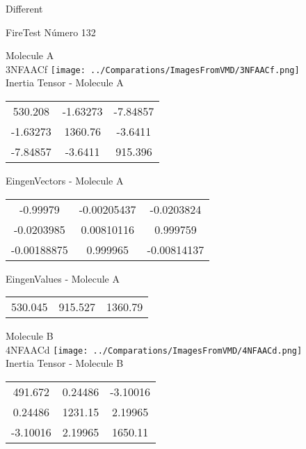 \begin{center}
\vtab
\vtab
\textcolor{NavyBlue}{\Large Different}
\end{center}

 \newpage

\vtab[-2cm]
\begin{center}
{\large FireTest \tab Número 132}
\end{center}
\begin{multicols}{2}
\begin{center}

Molecule A \\ 
3NFAACf
\texttt{[image: ../Comparations/ImagesFromVMD/3NFAACf.png]}
\\
Inertia Tensor - Molecule A \\
\vtab

\begin{tabular}{|c c c|}
530.208	 & 	-1.63273	 & 	-7.84857	 \\
-1.63273	 & 	1360.76	 & 	-3.6411	 \\
-7.84857	 & 	-3.6411	 & 	915.396
\end{tabular}

\vtab
 EingenVectors - Molecule A     \\
\vtab
\begin{tabular}{|c c c|}
-0.99979	 & 	-0.00205437	 & 	-0.0203824	 \\
-0.0203985	 & 	0.00810116	 & 	0.999759	 \\
-0.00188875	 & 	0.999965	 & 	-0.00814137
\end{tabular}

\vtab
 EingenValues - Molecule A     \\
\vtab
\begin{tabular}{|c c c|}
530.045	 & 	915.527	 & 	1360.79	 \\
\end{tabular}
\columnbreak

Molecule B \\ 
4NFAACd
\texttt{[image: ../Comparations/ImagesFromVMD/4NFAACd.png]}
\\
Inertia Tensor - Molecule B \\
\vtab

\begin{tabular}{|c c c|}
491.672	 & 	0.24486	 & 	-3.10016	 \\
0.24486	 & 	1231.15	 & 	2.19965	 \\
-3.10016	 & 	2.19965	 & 	1650.11
\end{tabular}


\end{center}
\end{multicols}
